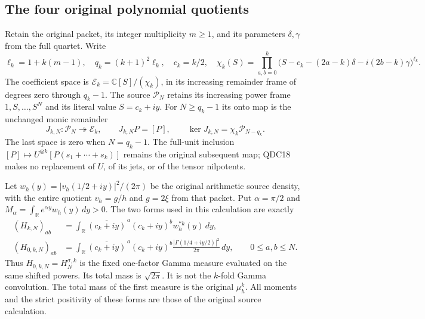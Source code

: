 \documentclass[11pt,a4paper]{article}
\begin{document}
\subsection{The four original polynomial quotients}

Retain the original packet, its integer multiplicity $m\ge1$,
and its parameters $\delta,\gamma$ from the full quartet.
Write
\[
 \ell_k=1+k(m-1),\quad q_k=(k+1)^2\ell_k,\quad c_k=k/2,\quad
 \chi_k(S)=\prod_{a,b=0}^k
 \bigl(S-c_k-(2a-k)\delta-i(2b-k)\gamma\bigr)^{\ell_k}.
 \tag{QDC17}
\]
The coefficient space is
$\mathcal E_k=\mathbb C[S]/(\chi_k)$, in its increasing
remainder frame of degrees zero through $q_k-1$.
The source $\mathcal P_N$ retains its increasing power frame
$1,S,\ldots,S^N$ and its literal value $S=c_k+iy$.
For $N\ge q_k-1$ its onto map is the unchanged monic remainder
\[
 J_{k,N}:\mathcal P_N\twoheadrightarrow\mathcal E_k,\qquad
 J_{k,N}P=[P],\qquad
 \ker J_{k,N}=\chi_k\mathcal P_{N-q_k}.
 \tag{QDC18}
\]
The last space is zero when $N=q_k-1$. The full-unit inclusion
$[P]\mapsto U^{\otimes k}[P(s_1+\cdots+s_k)]$ remains the
original subsequent map; QDC18 makes no replacement of $U$,
of its jets, or of the tensor nilpotents.

Let $w_h(y)=|v_h(1/2+iy)|^2/(2\pi)$ be the original
arithmetic source density, with the entire quotient $v_h=g/h$
and $g=2\xi$ from that packet. Put $\alpha=\pi/2$ and
$M_\alpha=\int_{\mathbb R}e^{\alpha y}w_h(y)\,dy>0$.
The two forms used in this calculation are exactly
\[
 \begin{split}
 (H_{k,N})_{ab}
 &=\int_{\mathbb R}\overline{(c_k+iy)}^{\,a}(c_k+iy)^b
                    w_h^{*k}(y)\,dy,\\
 (H_{0,k,N})_{ab}
 &=\int_{\mathbb R}\overline{(c_k+iy)}^{\,a}(c_k+iy)^b
       \frac{|\Gamma(1/4+iy/2)|^2}{2\pi}\,dy ,
 \qquad 0\le a,b\le N .
 \end{split}
 \tag{QDC19}
\]
Thus $H_{0,k,N}=H_N^{\sigma,k}$ is the fixed one-factor Gamma
measure evaluated on the same shifted powers. Its total mass
is $\sqrt{2\pi}$. It is not the $k$-fold Gamma convolution.
The total mass of the first measure is the original $\mu_h^k$.
All moments and the strict positivity of these forms are
those of the original source calculation.
\end{document}
